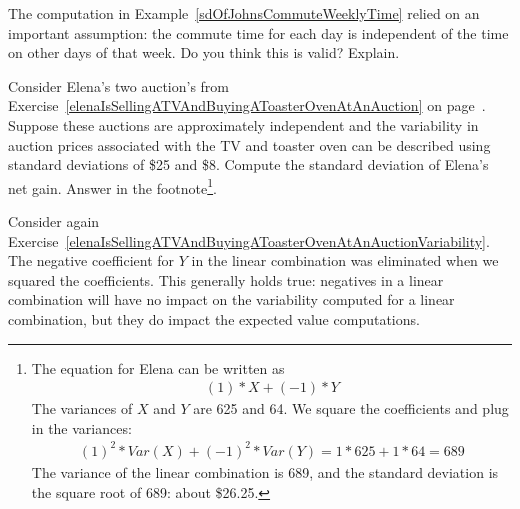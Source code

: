 \begin{exercise}
The computation in Example~\ref{sdOfJohnsCommuteWeeklyTime} relied on an important assumption: the commute time for each day is independent of the time on other days of that week. Do you think this is valid? Explain.
\end{exercise}

\begin{exercise}\label{elenaIsSellingATVAndBuyingAToasterOvenAtAnAuctionVariability}
Consider Elena's two auction's from Exercise~\ref{elenaIsSellingATVAndBuyingAToasterOvenAtAnAuction} on page~\pageref{elenaIsSellingATVAndBuyingAToasterOvenAtAnAuction}. Suppose these auctions are approximately independent and the variability in auction prices associated with the TV and toaster oven can be described using standard deviations of \$25 and \$8. Compute the standard deviation of Elena's net gain. Answer in the footnote\footnote{The equation for Elena can be written as
\begin{align*}
(1)*X + (-1)*Y
\end{align*}
The variances of $X$ and $Y$ are 625 and 64. We square the coefficients and plug in the variances:
\begin{align*}
(1)^2*Var(X) + (-1)^2*Var(Y) = 1*625 + 1*64 = 689
\end{align*}
The variance of the linear combination is 689, and the standard deviation is the square root of 689: about \$26.25.}.
\end{exercise}

Consider again Exercise~\ref{elenaIsSellingATVAndBuyingAToasterOvenAtAnAuctionVariability}. The negative coefficient for $Y$ in the linear combination was eliminated when we squared the coefficients. This generally holds true: negatives in a linear combination will have no impact on the variability computed for a linear combination, but they do impact the expected value computations.





